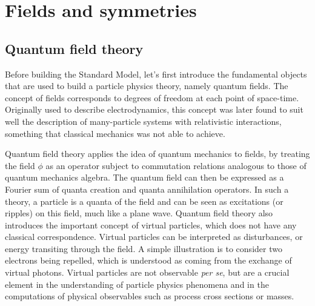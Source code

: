     \section{Fields and symmetries \label{sec:fieldsAndSymmetries}}

        \subsection{Quantum field theory}

    Before building the Standard Model, let's first introduce the fundamental objects
    that are used to build a particle physics theory, namely quantum fields. The concept
    of fields corresponds to degrees of freedom at each point of space-time. Originally
    used to describe electrodynamics, this concept was later found to suit well the
    description of many-particle systems with relativistic interactions, something that
    classical mechanics was not able to achieve.

    Quantum field theory \cite{Polonyi, Ryder} applies the idea of quantum mechanics to fields, by treating the
    field $\phi$ as an operator subject to commutation relations analogous to those of
    quantum mechanics algebra. The quantum field can then be expressed as a Fourier sum of quanta
    creation and quanta annihilation operators. In such a theory, a particle is a quanta
    of the field and can be seen as excitations (or ripples) on this field, much like a plane wave.
    Quantum field theory also introduces the important concept of virtual particles, which
    does not have any classical correspondence. Virtual particles can be interpreted as
    disturbances, or energy transiting through the field. A simple illustration is to
    consider two electrons being repelled, which is understood as coming from the
    exchange of virtual photons. Virtual particles are not observable \emph{per se}, but
    are a crucial element in the understanding of particle physics phenomena and in the
    computations of physical observables such as process cross sections or masses.

